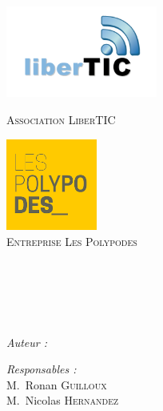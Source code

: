 
\begin{titlepage}

\begin{center}

\begin{minipage}[t]{0.48\textwidth}
  \begin{flushleft}
    \includegraphics [height=30mm]{img/logo-libertic.png} \\[0.2cm]
    \begin{spacing}{1.5}
      \textsc{\LARGE Association LiberTIC}
    \end{spacing}
  \end{flushleft}
\end{minipage}
\begin{minipage}[t]{0.48\textwidth}
  \begin{flushright}
    \includegraphics [height=30mm]{img/logo-polypodes.png} \\[0.5cm]
    \textsc{\LARGE Entreprise Les Polypodes}
  \end{flushright}
\end{minipage} %

\vfill

\textsc{\Large \reportsubject}\\[0.5cm]
\HRule \\[0.4cm]
{\huge \bfseries \reporttitle}\\[0.4cm]
\HRule \\[1.2cm]

\begin{minipage}[t]{0.3\textwidth}
  \begin{flushleft} \large
    \emph{Auteur :}\\
    \reportauthor
  \end{flushleft}
\end{minipage}
\begin{minipage}[t]{0.6\textwidth}
  \begin{flushright} \large
    \emph{Responsables :} \\
    M.~Ronan \textsc{Guilloux} \\
    M.~Nicolas \textsc{Hernandez}
  \end{flushright}
\end{minipage}



\end{center}
\end{titlepage}
